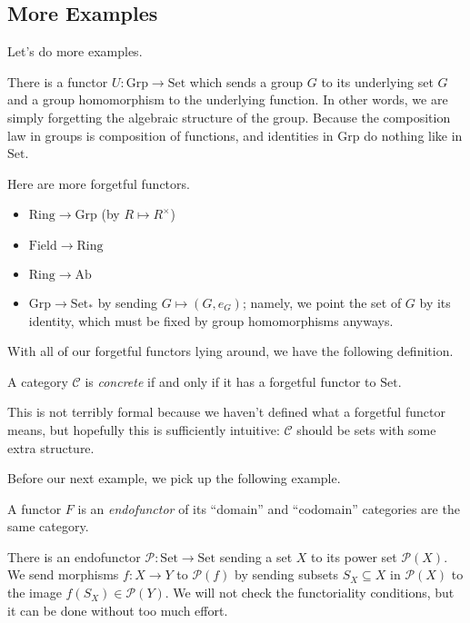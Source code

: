 \documentclass[../notes.tex]{subfiles}
\begin{document}
\subsection{More Examples}
Let's do more examples.
\begin{ex}[Forgetful]
	There is a functor $U:\mathrm{Grp}\to\mathrm{Set}$ which sends a group $G$ to its underlying set $G$ and a group homomorphism to the underlying function. In other words, we are simply forgetting the algebraic structure of the group. Because the composition law in groups is composition of functions, and identities in $\mathrm{Grp}$ do nothing like in $\mathrm{Set}$.
\end{ex}
\begin{example}[Forgetful]
	Here are more forgetful functors.
	\begin{itemize}
		\item $\mathrm{Ring}\to\mathrm{Grp}$ (by $R\mapsto R^\times$) 
		\item $\mathrm{Field}\to\mathrm{Ring}$
		\item $\mathrm{Ring}\to\mathrm{Ab}$
		\item $\mathrm{Grp}\to\mathrm{Set}_*$ by sending $G\mapsto(G,e_G)$; namely, we point the set of $G$ by its identity, which must be fixed by group homomorphisms anyways.
	\end{itemize}
\end{example}
With all of our forgetful functors lying around, we have the following definition.
\begin{definition}[Concrete]
	A category $\mathcal C$ is \textit{concrete} if and only if it has a forgetful functor to $\mathrm{Set}$.
\end{definition}
This is not terribly formal because we haven't defined what a forgetful functor means, but hopefully this is sufficiently intuitive: $\mathcal C$ should be sets with some extra structure.

Before our next example, we pick up the following example.
\begin{definition}[Endofunctor]
	A functor $F$ is an \textit{endofunctor} of its ``domain'' and ``codomain'' categories are the same category.
\end{definition}
\begin{example}
	There is an endofunctor $\mathcal P:\mathrm{Set}\to\mathrm{Set}$ sending a set $X$ to its power set $\mathcal P(X)$. We send morphisms $f:X\to Y$ to $\mathcal P(f)$ by sending subsets $S_X\subseteq X$ in $\mathcal P(X)$ to the image $f(S_X)\in\mathcal P(Y)$. We will not check the functoriality conditions, but it can be done without too much effort.
\end{example}
\end{document}
